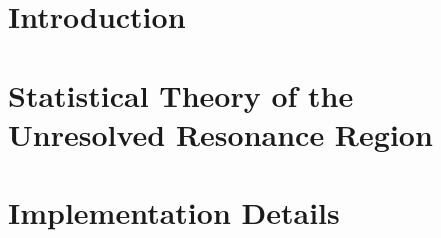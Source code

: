 \documentclass{thesis}
\author{Alec William Golas}
\begin{document}
 
\titlepage             %
\tableofcontents       %
\listoftables          %
\listoffigures         %


\chapter{Introduction}
\label{chap:introduction}


\chapter{Statistical Theory of the Unresolved Resonance Region}
\label{chap:theory}


\chapter{Implementation Details}
\label{chap:implementation}


% 

% 

% 

% 

% 
\end{document}
